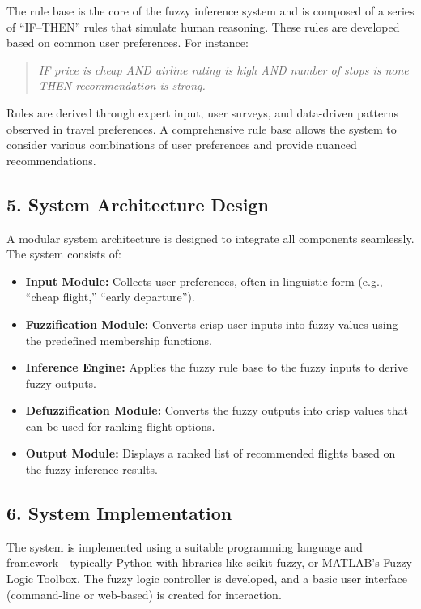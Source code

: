 \documentclass[a4paper]{article}
\begin{document}
The rule base is the core of the fuzzy inference system and is composed of a series of “IF–THEN” rules that simulate human reasoning. These rules are developed based on common user preferences. For instance:

\begin{quote}
\textit{IF price is cheap AND airline rating is high AND number of stops is none THEN recommendation is strong.}
\end{quote}

Rules are derived through expert input, user surveys, and data-driven patterns observed in travel preferences. A comprehensive rule base allows the system to consider various combinations of user preferences and provide nuanced recommendations.

\subsection*{5. System Architecture Design}

A modular system architecture is designed to integrate all components seamlessly. The system consists of:

\begin{itemize}
    \item \textbf{Input Module:} Collects user preferences, often in linguistic form (e.g., “cheap flight,” “early departure”).
    \item \textbf{Fuzzification Module:} Converts crisp user inputs into fuzzy values using the predefined membership functions.
    \item \textbf{Inference Engine:} Applies the fuzzy rule base to the fuzzy inputs to derive fuzzy outputs.
    \item \textbf{Defuzzification Module:} Converts the fuzzy outputs into crisp values that can be used for ranking flight options.
    \item \textbf{Output Module:} Displays a ranked list of recommended flights based on the fuzzy inference results.
\end{itemize}

\subsection*{6. System Implementation}

The system is implemented using a suitable programming language and framework—typically Python with libraries like scikit-fuzzy, or MATLAB’s Fuzzy Logic Toolbox. The fuzzy logic controller is developed, and a basic user interface (command-line or web-based) is created for interaction.
\end{document}
